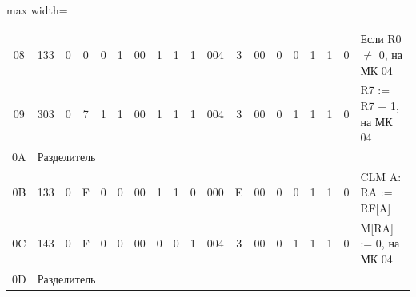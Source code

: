 \documentclass[11pt, a4paper]{article}
\begin{document}
{\begin{table}[h!]
\begin{adjustbox}{max width=\textwidth}
\begin{tabular}{|c|c|c|c|c|c|c|c|c|c|c|c|c|c|c|c|c|c|l|}
				08          & 133                               & 0                                 & 0                                      & 0                                      & 1             & 00          & 1                                       & 1                                     & 1                    & 004            & 3             & 00         & 0          & 0            & 1           & 1            & 0           & Если R0 $\neq$ 0, на МК 04     \\
				09          & 303                               & 0                                 & 7                                      & 1                                      & 1             & 00          & 1                                       & 1                                     & 1                    & 004            & 3             & 00         & 0          & 1            & 1           & 1            & 0           & R7 := R7 + 1, на МК 04         \\
				0A          & \multicolumn{18}{l|}{Разделитель}                                                                                                                                                                                                                                                                                                                                                                                                                    \\
				0B          & 133                               & 0                                 & F                                      & 0                                      & 0             & 00          & 1                                       & 1                                     & 0                    & 000            & E             & 00         & 0          & 0            & 1           & 1            & 0           & CLM A: RA := RF[A]             \\
				0C          & 143                               & 0                                 & F                                      & 0                                      & 0             & 00          & 0                                       & 0                                     & 1                    & 004            & 3             & 00         & 0          & 1            & 1           & 1            & 0           & M[RA] := 0, на МК 04           \\
				0D          & \multicolumn{18}{l|}{Разделитель}                                                                                                                                                                                                                                                                                                                                                                                                                    \\

\end{tabular}
\end{adjustbox}
\end{table}}
\end{document}
